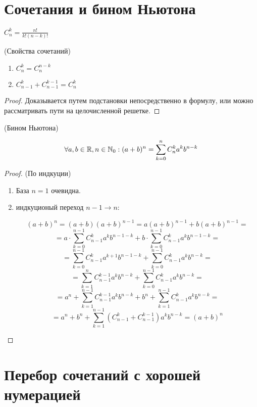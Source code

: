 \section{Сочетания и бином Ньютона}


$C_n^k = \frac{n!}{k!(n-k)!}$

\begin{properties} (Свойства сочетаний)
    \begin{enumerate}
        \item $C_n^k = C_n^{n-k}$
        \item $C_{n-1}^k + C_{n-1}^{k-1} = C_n^k$ 
    \end{enumerate}
\end{properties}

\begin{proof}
    Доказывается путем подстановки непосредственно в формулу, или можно рассматривать пути на целочисленной решетке. 
\end{proof}


\begin{theorem} (Бином Ньютона)
    
    $$\forall a, b \in \mathbb{R}, n \in \mathbb{N}_0: (a + b)^n = \sum_{k = 0}^{n}C_n^k a^k b^{n-k}$$
\end{theorem}

\begin{proof} (По индкуции)
    \begin{enumerate}
        \item База $n = 1$ очевидна.
        \item индкуционый переход $n - 1 \to n$:
        
        \[(a + b)^n = (a + b)(a + b)^{n-1} = a(a + b)^{n-1} + b(a + b)^{n-1} =\]
        \[= a \cdot \sum_{k=0}^{n-1}C_{n-1}^k a^k b^{n-1-k} + b \cdot \sum_{k=0}^{n-1}C_{n-1}^k a^k b^{n-1-k} = \]
        \[= \sum_{k=0}^{n-1}C_{n-1}^k a^{k+1} b^{n-1-k} + \sum_{k=0}^{n-1}C_{n-1}^k a^k b^{n-k} =\]
        \[= \sum_{k=1}^{n}C_{n-1}^{k-1} a^k b^{n-k} + \sum_{k=0}^{n-1}C_{n-1}^k a^k b^{n-k} =\]
        \[= a^n + \sum_{k=1}^{n-1}C_{n-1}^{k-1} a^k b^{n-k} + b^n + \sum_{k=1}^{n-1}C_{n-1}^k a^k b^{n-k} =\]
        \[= a^n + b^n + \sum_{k=1}^{n-1}(C_{n-1}^k + C_{n-1}^{k-1})a^k b^{n-k} = (a + b)^n \]
    \end{enumerate}
\end{proof}


\section{Перебор сочетаний с хорошей нумерацией}

